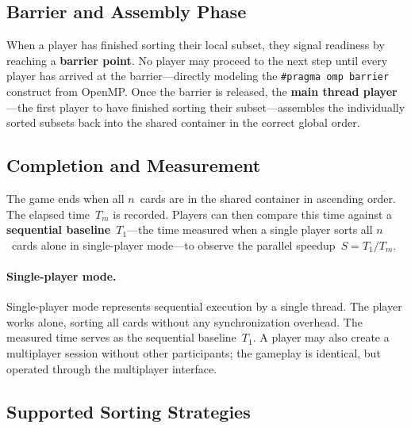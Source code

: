\subsection{Barrier and Assembly Phase}
\label{subsec:barrier-assembly-phase}

When a player has finished sorting their local subset, they signal readiness by reaching a \textbf{barrier point}. No player may proceed to the next step until every player has arrived at the barrier---directly modeling the \texttt{\#pragma omp barrier} construct from OpenMP. Once the barrier is released, the \textbf{main thread player}---the first player to have finished sorting their subset---assembles the individually sorted subsets back into the shared container in the correct global order.

\subsection{Completion and Measurement}
\label{subsec:completion-measurement}

The game ends when all $n$~cards are in the shared container in ascending order. The elapsed time~$T_m$ is recorded. Players can then compare this time against a \textbf{sequential baseline}~$T_1$---the time measured when a single player sorts all $n$~cards alone in single-player mode---to observe the parallel speedup~$S = T_1 / T_m$.

\paragraph*{Single-player mode.}
Single-player mode represents sequential execution by a single thread. The player works alone, sorting all cards without any synchronization overhead. The measured time serves as the sequential baseline~$T_1$. A player may also create a multiplayer session without other participants; the gameplay is identical, but operated through the multiplayer interface.

\subsection{Supported Sorting Strategies}
\label{subsec:supported-strategies}

